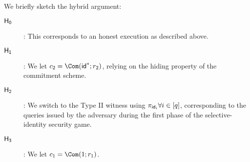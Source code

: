 We briefly sketch the hybrid argument:
\begin{description}
\item[$\mathsf{H_{0}}$]:
	This corresponds to an honest execution as described above.
\item[$\mathsf{H_{1}}$]:
	We let $c_2 = \Com(\id^* ; r_2)$, relying on the hiding property
	of the commitment scheme.
\item[$\mathsf{H_{2}}$]:
	We switch to the Type II witness using
	$\pi_{\mathsf{id}_i} \forall i \in [q]$, corresponding to the queries
	issued by the adversary during the first phase of the
	selective-identity security game.
\item[$\mathsf{H_{3}}$]:
	We let $c_1 = \Com(1 ; r_1)$.
\end{description}





\newcommand{\extline}{$\scriptsize$-$\normalsize$\!}
\newcommand{\lextlineend}{$\scriptsize$\lhd\!$\normalsize$}
\newcommand{\rextlineend}{$\scriptsize\rule{.1ex}{0ex}$\rhd$\normalsize$}


\newcommand\extlines[1]{%
  \setcounter{index}{0}%
  \whiledo {\value{index}< #1}
  {\addtocounter{index}{1}\extline}
}

\newcommand\rextlinearrow[2]{$
  \setbox0\hbox{$\extlines{#2}\rextlineend$}%
  \tiny$%
  \!\!\!\!\begin{array}{c}%
  \mathrm{#1}\\%
  \usebox0%
  \end{array}%
  $\normalsize$\!\!%
}

\newcommand\lextlinearrow[2]{$
  \setbox0\hbox{$\lextlineend\extlines{#2}$}%
  \tiny%
  $%
  \!\!\!\!\begin{array}{c}%
  \mathrm{#1}\\%
  \usebox0%
  \end{array}%
  $\normalsize$\!\!%
}

\renewcommand\lextlinearrow[2]{%
}

\renewcommand\rextlinearrow[2]{%
}
\renewcommand\lextlinearrow[2]{%
   $\stackrel{\mathrm{#1}}{\leftarrow}$%
}

\renewcommand\rextlinearrow[2]{%
  $\stackrel{\mathrm{#1}}{\rightarrow}$%
}



